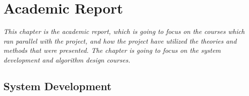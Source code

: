 \chapter{Academic Report}

\textit{This chapter is the academic report, which is going to focus on the courses which ran parallel with the project, and how the project have utilized the theories and methods that were presented. The chapter is going to focus on the system development and algorithm design courses.}

\section{System Development}
\label{SystemDev}
